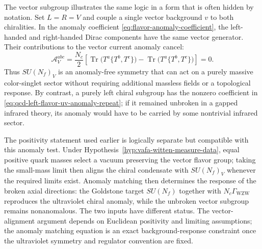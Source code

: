 The vector subgroup illustrates the same logic in a form that is often hidden
by notation.  Set \(L=R=V\) and couple a single vector background \(v\) to both
chiralities.  In the anomaly coefficient
\eqref{eq:flavor-anomaly-coefficient}, the left-handed and right-handed
Dirac components have the same vector generator.  Their contributions to the
vector current anomaly cancel:
\begin{equation}
  \mathcal A^{abc}_{V}
  =
  \frac{N_c}{2}
  \left[
    \operatorname{Tr}\bigl(T^a\{T^b,T^c\}\bigr)
    -
    \operatorname{Tr}\bigl(T^a\{T^b,T^c\}\bigr)
  \right]
  =
  0 .
  \label{eq:vector-flavor-anomaly-cancels}
\end{equation}
Thus \(SU(N_f)_V\) is an anomaly-free symmetry that can act on a purely
massive color-singlet sector without requiring additional massless fields or a
topological response.  By contrast, a purely left chiral subgroup has the
nonzero coefficient in \eqref{eq:qcd-left-flavor-uv-anomaly-repeat}; if it
remained unbroken in a gapped infrared theory, its anomaly would have to be
carried by some nontrivial infrared sector.

The positivity statement used earlier is logically separate but compatible
with this anomaly test.  Under Hypothesis~\ref{hyp:vafa-witten-measure-data},
equal positive quark masses select a vacuum preserving the vector flavor
group; taking the small-mass limit then aligns the chiral condensate with
\(SU(N_f)_V\) whenever the required limits exist.  Anomaly matching then
determines the response of the broken axial directions: the Goldstone target
\(SU(N_f)\) together with \(N_c\Gamma_{\mathrm{WZW}}\) reproduces the
ultraviolet chiral anomaly, while the unbroken vector subgroup remains
nonanomalous.  The two inputs have different status.  The vector-alignment
argument depends on Euclidean positivity and limiting assumptions; the anomaly
matching equation is an exact background-response constraint once the
ultraviolet symmetry and regulator convention are fixed.

